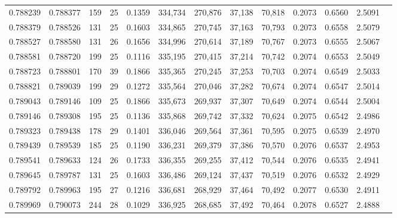 \begin{tabular}{rrrrrrrrrrrrr}
0.788239 & 0.788377 &   159 &  25 &                                     0.1359 & 334,734 & 270,876 &  37,138 &  70,818 & 0.2073 & 0.6560 & 2.5091 \\
0.788379 & 0.788526 &   131 &  25 &                                     0.1603 & 334,865 & 270,745 &  37,163 &  70,793 & 0.2073 & 0.6558 & 2.5079 \\
0.788527 & 0.788580 &   131 &  26 &                                     0.1656 & 334,996 & 270,614 &  37,189 &  70,767 & 0.2073 & 0.6555 & 2.5067 \\
0.788581 & 0.788720 &   199 &  25 &                                     0.1116 & 335,195 & 270,415 &  37,214 &  70,742 & 0.2074 & 0.6553 & 2.5049 \\
0.788723 & 0.788801 &   170 &  39 &                                     0.1866 & 335,365 & 270,245 &  37,253 &  70,703 & 0.2074 & 0.6549 & 2.5033 \\
0.788821 & 0.789039 &   199 &  29 &                                     0.1272 & 335,564 & 270,046 &  37,282 &  70,674 & 0.2074 & 0.6547 & 2.5014 \\
0.789043 & 0.789146 &   109 &  25 &                                     0.1866 & 335,673 & 269,937 &  37,307 &  70,649 & 0.2074 & 0.6544 & 2.5004 \\
0.789146 & 0.789308 &   195 &  25 &                                     0.1136 & 335,868 & 269,742 &  37,332 &  70,624 & 0.2075 & 0.6542 & 2.4986 \\
0.789323 & 0.789438 &   178 &  29 &                                     0.1401 & 336,046 & 269,564 &  37,361 &  70,595 & 0.2075 & 0.6539 & 2.4970 \\
0.789439 & 0.789539 &   185 &  25 &                                     0.1190 & 336,231 & 269,379 &  37,386 &  70,570 & 0.2076 & 0.6537 & 2.4953 \\
0.789541 & 0.789633 &   124 &  26 &                                     0.1733 & 336,355 & 269,255 &  37,412 &  70,544 & 0.2076 & 0.6535 & 2.4941 \\
0.789645 & 0.789787 &   131 &  25 &                                     0.1603 & 336,486 & 269,124 &  37,437 &  70,519 & 0.2076 & 0.6532 & 2.4929 \\
0.789792 & 0.789963 &   195 &  27 &                                     0.1216 & 336,681 & 268,929 &  37,464 &  70,492 & 0.2077 & 0.6530 & 2.4911 \\
0.789969 & 0.790073 &   244 &  28 &                                     0.1029 & 336,925 & 268,685 &  37,492 &  70,464 & 0.2078 & 0.6527 & 2.4888 \\

\end{tabular}
